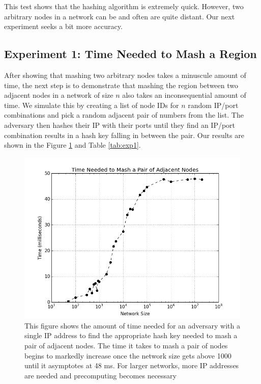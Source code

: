 \documentclass[11pt,conference]{IEEEtran}
\begin{document}
This test shows that the hashing algorithm is extremely quick.
However, two arbitrary nodes in a network can be and often are quite distant.
Our next experiment seeks a bit more accuracy.


\subsection{Experiment 1:  Time Needed to Mash a Region}
\label{sec:exp1}
After showing that mashing two arbitrary nodes takes a minuscule amount of time, the next step is to demonstrate that mashing the region between two adjacent nodes in a network of size $n$ also takes an inconsequential amount of time.
We simulate this by creating a list of node IDs for $n$ random IP/port combinations and pick a random adjacent pair of numbers from the list.
The adversary then hashes their IP with their ports until they find an IP/port combination results in a hash key falling in between the pair.
Our results are shown in the Figure \ref{fig:exp1} and Table \ref{tab:exp1}.

\begin{figure}
\centering
\includegraphics[width=\linewidth]{size_time}
\caption{This figure shows the amount of time needed for an adversary with a single IP address to find the appropriate hash key needed to mash a pair of adjacent nodes.  The time it takes to mash a pair of nodes begins to markedly increase once the network size gets above 1000 until it asymptotes at 48 ms.  For larger networks, more IP addresses are needed and precomputing becomes necessary}
\label{fig:exp1}
\end{figure}
\end{document}
